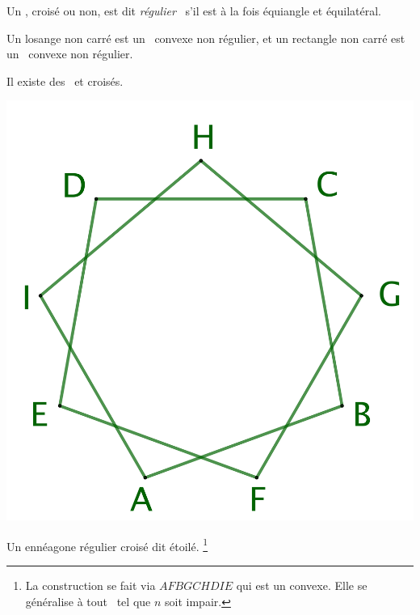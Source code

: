 \begin{defi}
	Un \ngone, croisé ou non, est dit \og \emph{régulier} \fg\ s'il est à la fois équiangle et équilatéral.
\end{defi}


\begin{remark}
	Un losange non carré est un \nequi\ convexe non régulier, et un rectangle non carré est un \niso\ convexe non régulier.
\end{remark}


\begin{remark}
	Il existe des \nregs\ et croisés.


    \vspace{-1.5em}
    
    \begin{multicols}{2}
    	\small\itshape\centering
    	
	    \null\vfill

	    \includegraphics[scale=.175]{content/polygon/def/9-iso-non-conv.png}
    
        \smallskip
        Un ennéagone régulier croisé dit étoilé.%
	    \footnote{
	        La construction se fait via $AFBGCHDIE$ qui est un  convexe. Elle se généralise à tout \nreg\ tel que $n$ soit impair.
	    }



\end{multicols}
\end{remark}
